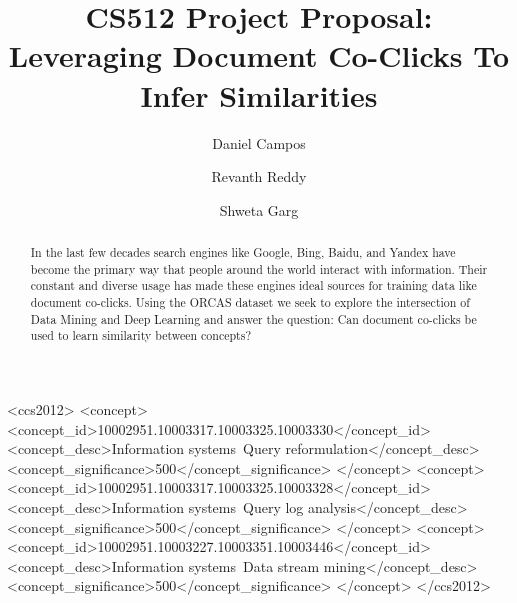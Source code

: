 \documentclass[sigplan,screen]{acmart}
\begin{document}
\title{CS512 Project Proposal: Leveraging Document Co-Clicks To Infer Similarities}


\author{Daniel Campos} \author{Revanth Reddy}
\author{Shweta Garg} 


\begin{abstract}
In the last few decades search engines like Google, Bing, Baidu, and Yandex have become the primary way that people around the world interact with information. Their constant and diverse usage has made these engines ideal sources for training data like document co-clicks. Using the ORCAS dataset we seek to explore the intersection of Data Mining and Deep Learning and answer the question: Can document co-clicks be used to learn similarity between concepts?
\end{abstract}

\begin{CCSXML}
<ccs2012>
<concept>
<concept_id>10002951.10003317.10003325.10003330</concept_id>
<concept_desc>Information systems~Query reformulation</concept_desc>
<concept_significance>500</concept_significance>
</concept>
<concept>
<concept_id>10002951.10003317.10003325.10003328</concept_id>
<concept_desc>Information systems~Query log analysis</concept_desc>
<concept_significance>500</concept_significance>
</concept>
<concept>
<concept_id>10002951.10003227.10003351.10003446</concept_id>
<concept_desc>Information systems~Data stream mining</concept_desc>
<concept_significance>500</concept_significance>
</concept>
</ccs2012>
\end{CCSXML}



\maketitle






\end{document}
